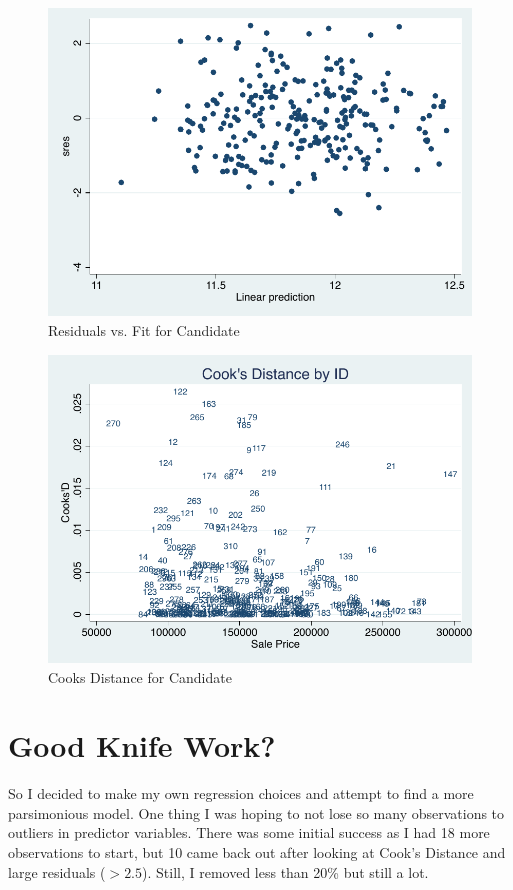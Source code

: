 \documentclass[twocolumn,11pt]{article}
\begin{document}
\begin{figure}[H]
\centering
  \includegraphics[width=.9\linewidth]{figures/reg-man-rvf}
  \caption{Residuals vs. Fit for Candidate}
  \label{fig:reg-man-rvf}
\end{figure}
\begin{figure}[H]
\centering
  \includegraphics[width=.9\linewidth]{figures/reg-man-cooked}
  \caption{Cooks Distance for Candidate}
  \label{fig:reg-man-cooked}
\end{figure}


\section*{Good Knife Work?}
So I decided to make my own regression choices and attempt to find a more parsimonious model.
One thing I was hoping to not lose so many observations to outliers in predictor variables.
There was some initial success as I had 18 more observations to start,
but 10 came back out after looking at Cook's Distance and large residuals ($>2.5$).
Still, I removed less than 20\% but still a lot.
\end{document}

